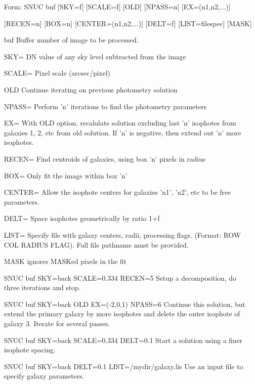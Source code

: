 {\newpage\clearpage
{}%
\begin{command} 
  \item[Form: SNUC buf {[SKY=f]} {[SCALE=f]} {[OLD]} {[NPASS=n]} 
       {[EX=(n1,n2,...)]}\hfill]{}
  \item{{[RECEN=n]} {[BOX=n]} {[CENTER=(n1,n2,...)]} {[DELT=f]} 
       {[LIST=filespec]} {[MASK]}}
  \item[buf]{Buffer number of image to be processed.}
  \item[SKY=]{DN value of any sky level subtracted from the image}
  \item[SCALE=]{Pixel scale (arcsec/pixel)}
  \item[OLD]{Continue iterating on previous photometry solution}
  \item[NPASS=]{Perform 'n' iterations to find the photometry parameters}
  \item[EX=]{With OLD option, recalulate solution excluding last 'n'
       isophotes from galaxies 1, 2, etc from old solution. If
       'n' is negative, then extend out 'n' more isophotes.}
  \item[RECEN=]{Find centroids of galaxies, using box 'n' pixels in radius}
  \item[BOX=]{Only fit the image within box 'n'}
  \item[CENTER=]{Allow the isophote centers for galaxies 'n1', 'n2', etc
       to be free parameters.}
  \item[DELT=]{Space isophotes geometrically by ratio 1+f}
  \item[LIST=]{Specify file with galaxy centers, radii, processing flags.
       (Format: ROW COL RADIUS FLAG). Full file pathname must be
       provided.}
  \item[MASK]{ignores MASKed pixels in the fit}
\end{command}%
\lthtmlfigureZ
\lthtmlcheckvsize\clearpage}

{\newpage\clearpage
{}%
\begin{example}
  \item[SNUC buf SKY=back SCALE=0.334 RECEN=5\hfill]{Setup a
       decomposition, do three iterations and stop.}
\par
\item[SNUC buf SKY=back OLD EX=(-2,0,1) NPASS=6\hfill]{Continue this
       solution, but extend the primary galaxy by more isophotes and delete
       the outer isophote of galaxy 3.  Iterate for several passes.}
\par
\item[SNUC buf SKY=back SCALE=0.334 DELT=0.1\hfill]{Start a solution
       using a finer isophote spacing.}
\par
\item[SNUC buf SKY=back DELT=0.1 LIST=/mydir/galaxy.lis\hfill]{Use an
       input file to specify galaxy parameters.}
\end{example}%
\lthtmlfigureZ
\lthtmlcheckvsize\clearpage}

